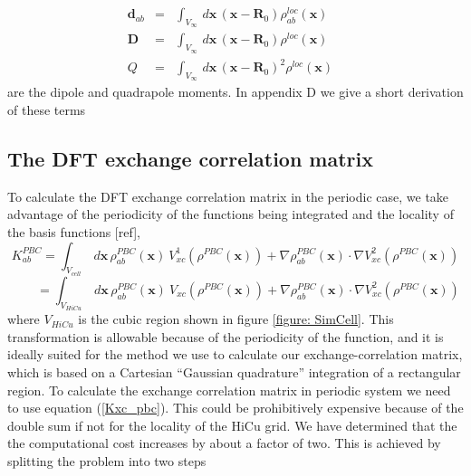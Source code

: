 \commentoutA{\documentclass[prb,aps,twocolumn,showpacs,twocolumngrid,superbib]{revtex4}}
\begin{document}
\begin{eqnarray}
{\mathbf{d}}_{ab} & = & \int _{V_{\infty }}\, d{\mathbf{x}}\, \left( \mathbf{x}-\mathbf{R}_{0}\right) \rho ^{loc}_{ab}\left( \mathbf{x}\right) \begin{array}{c}
\\

\end{array}\label{dab} \\
{\mathbf{D}} & = & \int _{V_{\infty }}\, d{\mathbf{x}}\, \left( \mathbf{x}-\mathbf{R}_{0}\right) \rho ^{loc}\left( \mathbf{x}\right) \begin{array}{c}
\\

\end{array}\label{D} \\
Q & = & \int _{V_{\infty }}\, d{\mathbf{x}}\, \left( \mathbf{x}-\mathbf{R}_{0}\right) ^{2}\rho ^{loc}\left( \mathbf{x}\right) \begin{array}{c}
\\

\end{array}\label{Q} 
\end{eqnarray}
are the dipole and quadrapole moments. In appendix D we give a short
derivation of these terms


\subsection{The DFT exchange correlation matrix}

To calculate the DFT exchange correlation matrix in the periodic case,
we take advantage of the periodicity of the functions being integrated
and the locality of the basis functions {[}ref{]},\[
K_{ab}^{PBC}=\int _{V_{cell}}\, d\mathbf{x}\, \rho _{ab}^{PBC}\left( \mathbf{x}\right) \: V^{1}_{xc}\left( \rho ^{PBC}\left( \mathbf{x}\right) \right) +\nabla \rho _{ab}^{PBC}\left( \mathbf{x}\right) \cdot \nabla V^{2}_{xc}\left( \rho ^{PBC}\left( \mathbf{x}\right) \right) \]
\begin{equation}
\label{Kxc_pbc}
\qquad =\int _{V_{HiCu}}\, d\mathbf{x}\, \rho _{ab}^{PBC}\left( \mathbf{x}\right) \: V_{xc}\left( \rho ^{PBC}\left( \mathbf{x}\right) \right) +\nabla \rho _{ab}^{PBC}\left( \mathbf{x}\right) \cdot \nabla V^{2}_{xc}\left( \rho ^{PBC}\left( \mathbf{x}\right) \right) 
\end{equation}
where \( V_{HiCu} \) is the cubic region shown in figure \ref{figure: SimCell}.
This transformation is allowable because of the periodicity of the
function, and it is ideally suited for the method we use to calculate
our exchange-correlation matrix, which is based on a Cartesian {}``Gaussian
quadrature'' integration of a rectangular region. To calculate the
exchange correlation matrix in periodic system we need to use equation
(\ref{Kxc_pbc}). This could be prohibitively expensive because of
the double sum if not for the locality of the HiCu grid. We have determined
that the the computational cost increases by about a factor of two.
This is achieved by splitting the problem into two steps
\end{document}
